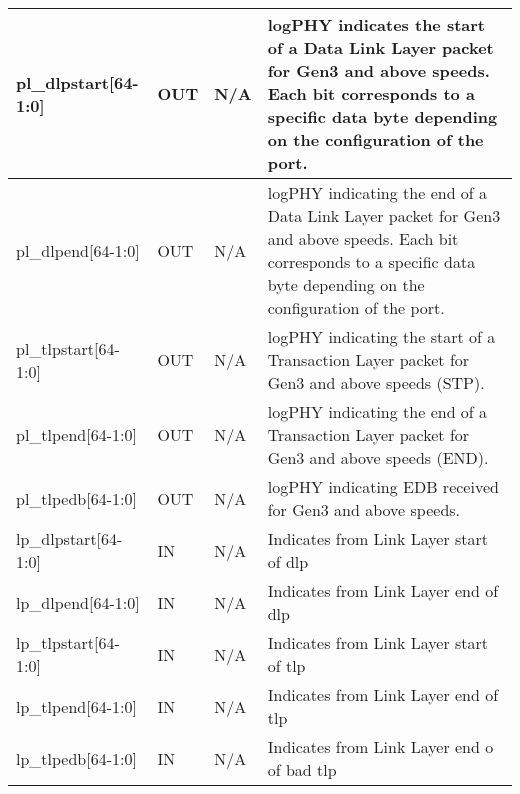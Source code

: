 \begin{table}[H]

    \centering
  \begin{tabular}{ |m{26mm}|P{10mm}|P{18mm}|m{60mm}|  }
  \hline

pl\_dlpstart[64-1:0] & OUT &N/A & logPHY indicates the start of a Data Link Layer packet for Gen3 and above speeds. Each
bit corresponds to a specific data byte depending on the configuration of the port.\\ \hline 
pl\_dlpend[64-1:0]& OUT &N/A & logPHY indicating the end of a Data Link Layer packet for Gen3 and above speeds. Each
bit corresponds to a specific data byte depending on the configuration of the port.\\ \hline
pl\_tlpstart[64-1:0]& OUT &N/A &logPHY indicating the start of a Transaction Layer packet for Gen3 and above speeds
(STP). \\ \hline
pl\_tlpend[64-1:0]& OUT &N/A & logPHY indicating the end of a Transaction Layer packet for Gen3 and above speeds
(END).\\ \hline
pl\_tlpedb[64-1:0]& OUT &N/A & logPHY indicating EDB received for Gen3 and above speeds. \\ \hline

lp\_dlpstart[64-1:0] & IN &N/A & 
Indicates from Link Layer start of dlp\\ \hline 
lp\_dlpend[64-1:0]& IN &N/A & 
Indicates from Link Layer end of dlp\\ \hline
lp\_tlpstart[64-1:0]& IN &N/A &
Indicates from Link Layer start of tlp \\ \hline
lp\_tlpend[64-1:0]& IN &N/A & 
Indicates from Link Layer end of tlp\\ \hline
lp\_tlpedb[64-1:0]& IN &N/A & 
Indicates from Link Layer end o of bad tlp\\ \hline

\end{tabular}
\end{table}


